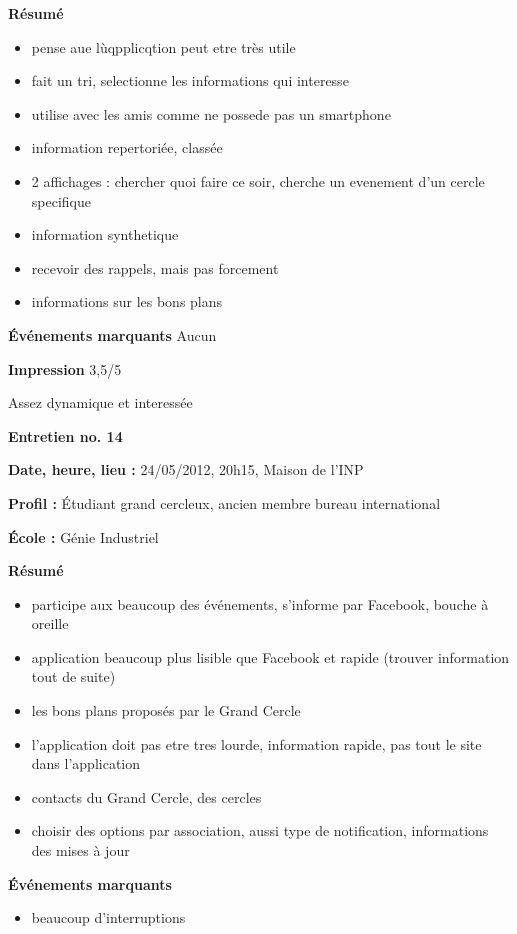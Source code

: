 \documentclass[a4paper, 11px]{article}
\begin{document}
\textbf{Résumé}
	\begin{itemize}
		\item pense aue lùqpplicqtion peut etre très utile
		\item fait un tri, selectionne les informations qui interesse
		\item utilise avec les amis comme ne possede pas un smartphone
		\item information repertoriée, classée
		\item 2 affichages : chercher quoi faire ce soir, cherche un evenement d'un cercle specifique
		\item information synthetique
		\item recevoir des rappels, mais pas forcement
		\item informations sur les bons plans
	\end{itemize}

\textbf{Événements marquants}
Aucun

\textbf{Impression}
3,5/5

Assez dynamique et interessée




\vspace{.3cm}

 \textbf {\large Entretien no. 14}

\textbf{Date, heure, lieu : }
24/05/2012, 20h15, Maison de l'INP

\textbf{Profil : }
Étudiant grand cercleux, ancien membre bureau international

\textbf{École : }
Génie Industriel

\textbf{Résumé}
	\begin{itemize}
		\item participe aux beaucoup des événements, s'informe par Facebook, bouche à oreille
		\item application beaucoup plus lisible que Facebook et rapide (trouver information tout de suite)
		\item les bons plans proposés par le Grand Cercle
		\item l'application doit pas etre tres lourde, information rapide, pas tout le site dans l'application
		\item contacts du Grand Cercle, des cercles
		\item choisir des options par association, aussi type de notification, informations des mises à jour
	\end{itemize}

\textbf{Événements marquants}
	\begin{itemize}
		\item beaucoup d'interruptions
	\end{itemize}
\end{document}
